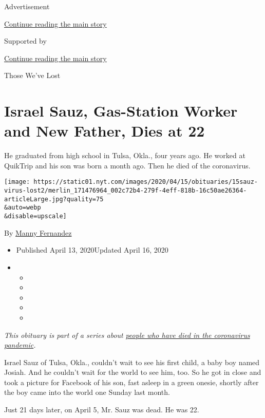 Advertisement

\protect\hyperlink{after-top}{Continue reading the main story}

Supported by

\protect\hyperlink{after-sponsor}{Continue reading the main story}

Those We've Lost

\hypertarget{israel-sauz-gas-station-worker-and-new-father-dies-at-22}{%
\section{Israel Sauz, Gas-Station Worker and New Father, Dies at
22}\label{israel-sauz-gas-station-worker-and-new-father-dies-at-22}}

He graduated from high school in Tulsa, Okla., four years ago. He worked
at QuikTrip and his son was born a month ago. Then he died of the
coronavirus.

\texttt{[image: https://static01.nyt.com/images/2020/04/15/obituaries/15sauz-virus-lost2/merlin\_171476964\_002c72b4-279f-4eff-818b-16c50ae26364-articleLarge.jpg?quality=75\\\&auto=webp\\\&disable=upscale]}

By \href{https://www.nytimes.com/by/manny-fernandez}{Manny Fernandez}

\begin{itemize}
\item
  Published April 13, 2020Updated April 16, 2020
\item
  \begin{itemize}
  \item
  \item
  \item
  \item
  \item
  \end{itemize}
\end{itemize}

\emph{This obituary is part of a series about}
\href{https://www.nytimes.com/series/people-who-have-died-of-the-coronavirus}{\emph{people
who have died in the coronavirus pandemic}}\emph{.}

Israel Sauz of Tulsa, Okla., couldn't wait to see his first child, a
baby boy named Josiah. And he couldn't wait for the world to see him,
too. So he got in close and took a picture for Facebook of his son, fast
asleep in a green onesie, shortly after the boy came into the world one
Sunday last month.

Just 21 days later, on April 5, Mr. Sauz was dead. He was 22.

